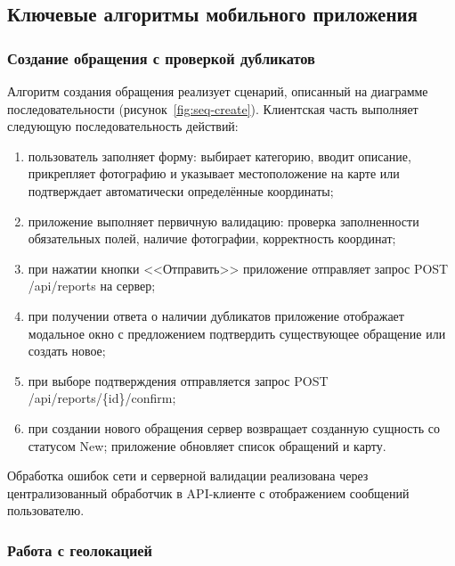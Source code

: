 \subsection{Ключевые алгоритмы мобильного приложения}

\subsubsection{Создание обращения с проверкой дубликатов}

Алгоритм создания обращения реализует сценарий, описанный на диаграмме последовательности (рисунок~\ref{fig:seq-create}). Клиентская часть выполняет следующую последовательность действий:
\begin{enumerate}
    \item пользователь заполняет форму: выбирает категорию, вводит описание, прикрепляет фотографию и указывает местоположение на карте или подтверждает автоматически определённые координаты;
    \item приложение выполняет первичную валидацию: проверка заполненности обязательных полей, наличие фотографии, корректность координат;
    \item при нажатии кнопки <<Отправить>> приложение отправляет запрос POST /api/reports на сервер;
    \item при получении ответа о наличии дубликатов приложение отображает модальное окно с предложением подтвердить существующее обращение или создать новое;
    \item при выборе подтверждения отправляется запрос POST /api/reports/\{id\}/confirm;
    \item при создании нового обращения сервер возвращает созданную сущность со статусом New; приложение обновляет список обращений и карту.
\end{enumerate}

Обработка ошибок сети и серверной валидации реализована через централизованный обработчик в API-клиенте с отображением сообщений пользователю.

\subsubsection{Работа с геолокацией}

